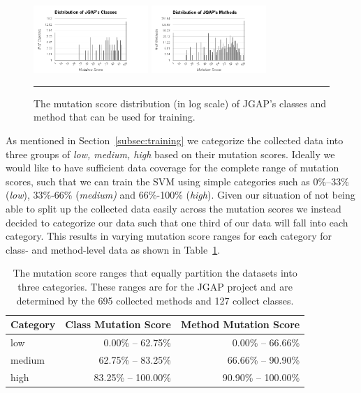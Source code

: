 \documentclass[conference]{IEEEtran}
\begin{document}
\begin{figure}[!t]
  \centering
  \includegraphics[width=4.35cm]{figures/class_distribution.png}
  \includegraphics[width=4.35cm]{figures/method_distribution.png}
  \caption{The mutation score distribution (in log scale) of JGAP's classes and method that can be used for training.}
  \label{fig:mutation_distributions}
  \vspace{2mm}
  \hrule
\end{figure}

As mentioned in Section~\ref{subsec:training} we categorize the collected data into three groups of \textit{low, medium, high} based on their mutation scores. Ideally we would like to have sufficient data coverage for the complete range of mutation scores, such that we can train the SVM using simple categories such as 0\%--33\% (\textit{low}), 33\%-66\% (\textit{medium)} and 66\%-100\% (\textit{high}). Given our situation of not being able to split up the collected data easily across the mutation scores we instead decided to categorize our data such that one third of our data will fall into each category. This results in varying mutation score ranges for each category for class- and method-level data as shown in Table~\ref{tab:results_details}.

\begin{table}[!t]
  \centering
  \begin{tabular}{|l|r|r|}
    \hline
    \rowcolor[RGB]{169,196,223}
    \textbf{Category} & \textbf{Class Mutation Score} & \textbf{Method Mutation Score} \\
    \hline low & 0.00\% -- 62.75\% & 0.00\% -- 66.66\% \\
    \hline medium & 62.75\% -- 83.25\% & 66.66\% -- 90.90\% \\
    \hline high & 83.25\% -- 100.00\% & 90.90\% -- 100.00\% \\
    \hline
  \end{tabular}
  \caption{The mutation score ranges that equally partition the datasets into three categories. These ranges are for the JGAP project and are determined by the 695 collected methods and 127 collect classes.}
  \label{tab:results_details}
\end{table}
\end{document}
